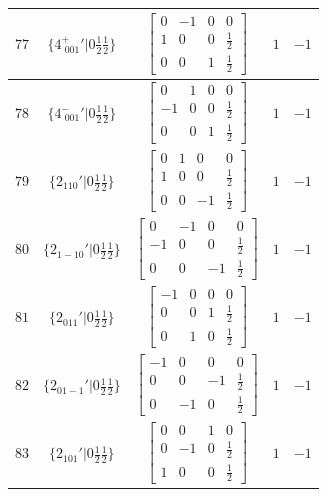 \documentclass[fleqn,8pt]{jsarticle}
\begin{document}
\begin{longtable}{ccccc}
$ 77 $ & $ \{4^{+}_{\,\,001}{}'|0 \frac{1}{2} \frac{1}{2}\} $ & $ \begin{bmatrix} 0 & -1 & 0 & 0 \\ 1 & 0 & 0 & \frac{1}{2} \\ 0 & 0 & 1 & \frac{1}{2} \end{bmatrix} $ & $ 1 $ & $ -1 $ \\ \hline
$ 78 $ & $ \{4^{-}_{\,\,001}{}'|0 \frac{1}{2} \frac{1}{2}\} $ & $ \begin{bmatrix} 0 & 1 & 0 & 0 \\ -1 & 0 & 0 & \frac{1}{2} \\ 0 & 0 & 1 & \frac{1}{2} \end{bmatrix} $ & $ 1 $ & $ -1 $ \\ \hline
$ 79 $ & $ \{2{}_{110}{}'|0 \frac{1}{2} \frac{1}{2}\} $ & $ \begin{bmatrix} 0 & 1 & 0 & 0 \\ 1 & 0 & 0 & \frac{1}{2} \\ 0 & 0 & -1 & \frac{1}{2} \end{bmatrix} $ & $ 1 $ & $ -1 $ \\ \hline
$ 80 $ & $ \{2{}_{1-10}{}'|0 \frac{1}{2} \frac{1}{2}\} $ & $ \begin{bmatrix} 0 & -1 & 0 & 0 \\ -1 & 0 & 0 & \frac{1}{2} \\ 0 & 0 & -1 & \frac{1}{2} \end{bmatrix} $ & $ 1 $ & $ -1 $ \\ \hline
$ 81 $ & $ \{2{}_{011}{}'|0 \frac{1}{2} \frac{1}{2}\} $ & $ \begin{bmatrix} -1 & 0 & 0 & 0 \\ 0 & 0 & 1 & \frac{1}{2} \\ 0 & 1 & 0 & \frac{1}{2} \end{bmatrix} $ & $ 1 $ & $ -1 $ \\ \hline
$ 82 $ & $ \{2{}_{01-1}{}'|0 \frac{1}{2} \frac{1}{2}\} $ & $ \begin{bmatrix} -1 & 0 & 0 & 0 \\ 0 & 0 & -1 & \frac{1}{2} \\ 0 & -1 & 0 & \frac{1}{2} \end{bmatrix} $ & $ 1 $ & $ -1 $ \\ \hline
$ 83 $ & $ \{2{}_{101}{}'|0 \frac{1}{2} \frac{1}{2}\} $ & $ \begin{bmatrix} 0 & 0 & 1 & 0 \\ 0 & -1 & 0 & \frac{1}{2} \\ 1 & 0 & 0 & \frac{1}{2} \end{bmatrix} $ & $ 1 $ & $ -1 $ \\ \hline

\end{longtable}
\end{document}

